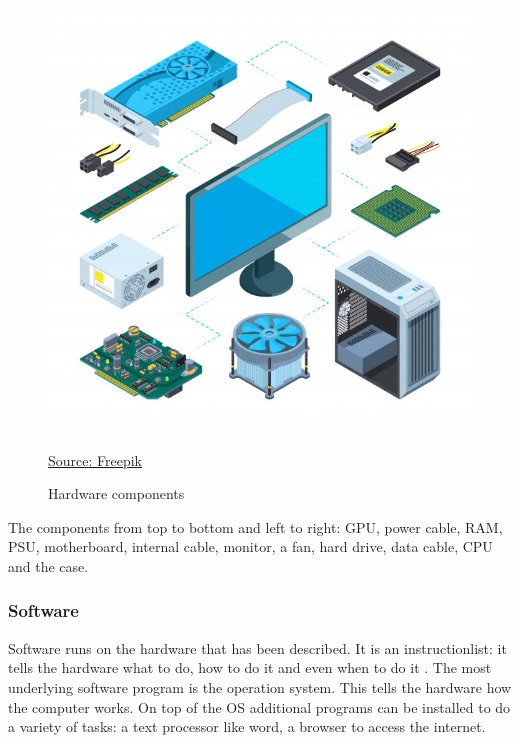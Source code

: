 \begin{figure} [h]
    \centering
    \includegraphics[width=\textwidth]{img/hardware.jpg}
        \caption{Hardware components}
        \label{fig:hardware}
        \href{https://nl.freepik.com/premium-vector/computer-hardware_4618150.htm}{Source: Freepik}
\end{figure}

The components from top to bottom and left to right: GPU, power cable, RAM, PSU, motherboard, internal cable, monitor, a fan, hard drive, data cable, CPU and the case.


\subsubsection{Software} \label{software}
Software runs on the hardware that has been described. It is an instructionlist: it tells the hardware what to do, how to do it and even when to do it \autocite{software}.
The most underlying software program is the operation system. This tells the hardware how the computer works. On top of the OS additional programs can be installed to do a variety of tasks: a text processor like word, a browser to access the internet.


